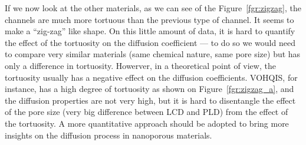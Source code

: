 \documentclass[main]{subfiles}
\begin{document}
If we now look at the other materials, as we can see of the Figure~\ref{fgr:zigzag}, the channels are much more tortuous than the previous type of channel. It seems to make a ``zig-zag'' like shape. On this little amount of data, it is hard to quantify the effect of the tortuosity on the diffusion coefficient --- to do so we would need to compare very similar materials (same chemical nature, same pore size) but has only a difference in tortuosity. Howerver, in a theoretical point of view, the tortuosity usually has a negative effect on the diffusion coefficients. VOHQIS, for instance, has a high degree of tortuosity as shown on Figure~\ref{fgr:zigzag_a}, and the diffusion properties are not very high, but it is hard to disentangle the effect of the pore size (very big difference between LCD and PLD) from the effect of the tortuosity. A more quantitative approach should be adopted to bring more insights on the diffusion process in nanoporous materials. 
\end{document}
